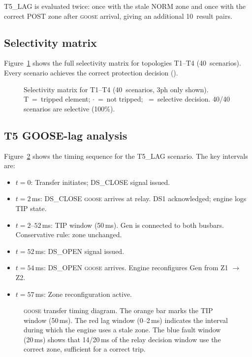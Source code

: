 \documentclass[11pt,a4paper]{article}
\newcommand{\goose}{\textsc{goose}}
\begin{document}
T5\_LAG is evaluated twice: once with the stale NORM zone and once with
the correct POST zone after \goose{} arrival, giving an additional 10~result
pairs.

\subsection{Selectivity matrix}

Figure~\ref{fig:matrix} shows the full selectivity matrix for topologies
T1--T4 (40~scenarios).  Every scenario achieves the correct protection
decision (\checkmark).

\begin{figure}[h]
  \centering
  \resizebox{0.85\textwidth}{!}{%
  }
  \caption{Selectivity matrix for T1--T4 (40~scenarios, 3ph only shown).
           T~=~tripped element; $\cdot$~=~not tripped;
           \checkmark~=~selective decision.  40/40 scenarios are selective
           (100\%).}
  \label{fig:matrix}
\end{figure}

\subsection{T5 GOOSE-lag analysis}
\label{sec:lag_analysis}

Figure~\ref{fig:goose_timing} shows the timing sequence for the T5\_LAG
scenario.  The key intervals are:

\begin{itemize}
  \item $t = 0$: Transfer initiates; DS\_CLOSE signal issued.
  \item $t = 2$\,ms: DS\_CLOSE \goose{} arrives at relay.  DS1 acknowledged;
        engine logs TIP state.
  \item $t = 2$--$52$\,ms: TIP window (50\,ms).  Gen is connected to both
        busbars.  Conservative rule: zone unchanged.
  \item $t = 52$\,ms: DS\_OPEN signal issued.
  \item $t = 54$\,ms: DS\_OPEN \goose{} arrives.  Engine reconfigures Gen
        from Z1 $\to$ Z2.
  \item $t = 57$\,ms: Zone reconfiguration active.
\end{itemize}

\begin{figure}[h]
  \centering
  \resizebox{0.88\textwidth}{!}{%
  }
  \caption{\goose{} transfer timing diagram.  The orange bar marks the
           TIP window (50\,ms).  The red lag window (0--2\,ms) indicates
           the interval during which the engine uses a stale zone.
           The blue fault window (20\,ms) shows that 14/20\,ms of the relay
           decision window use the correct zone, sufficient for a correct
           trip.}
  \label{fig:goose_timing}
\end{figure}
\end{document}
